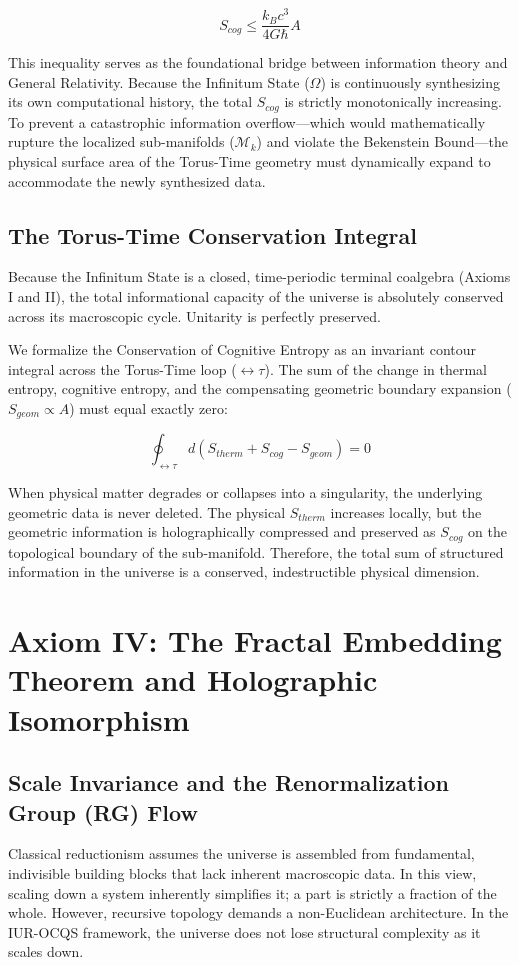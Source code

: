 \documentclass[12pt,openany]{book}
\begin{document}
\begin{equation}
S_{cog} \le \frac{k_B c^3}{4G\hbar} A
\end{equation}

This inequality serves as the foundational bridge between information theory and General Relativity. Because the Infinitum State ($\Omega$) is continuously synthesizing its own computational history, the total $S_{cog}$ is strictly monotonically increasing. To prevent a catastrophic information overflow---which would mathematically rupture the localized sub-manifolds ($\mathcal{M}_k$) and violate the Bekenstein Bound---the physical surface area of the Torus-Time geometry must dynamically expand to accommodate the newly synthesized data. 

\subsection{The Torus-Time Conservation Integral}
Because the Infinitum State is a closed, time-periodic terminal coalgebra (Axioms I and II), the total informational capacity of the universe is absolutely conserved across its macroscopic cycle. Unitarity is perfectly preserved. 

We formalize the Conservation of Cognitive Entropy as an invariant contour integral across the Torus-Time loop ($\leftrightarrow\tau$). The sum of the change in thermal entropy, cognitive entropy, and the compensating geometric boundary expansion ($S_{geom} \propto A$) must equal exactly zero:

\begin{equation}
\oint_{\leftrightarrow\tau} d(S_{therm} + S_{cog} - S_{geom}) = 0
\end{equation}

When physical matter degrades or collapses into a singularity, the underlying geometric data is never deleted. The physical $S_{therm}$ increases locally, but the geometric information is holographically compressed and preserved as $S_{cog}$ on the topological boundary of the sub-manifold. Therefore, the total sum of structured information in the universe is a conserved, indestructible physical dimension.

\section[Axiom IV]{Axiom IV: The Fractal Embedding Theorem and Holographic Isomorphism}

\subsection{Scale Invariance and the Renormalization Group (RG) Flow}
Classical reductionism assumes the universe is assembled from fundamental, indivisible building blocks that lack inherent macroscopic data. In this view, scaling down a system inherently simplifies it; a part is strictly a fraction of the whole. However, recursive topology demands a non-Euclidean architecture. In the IUR-OCQS framework, the universe does not lose structural complexity as it scales down. 
\end{document}
